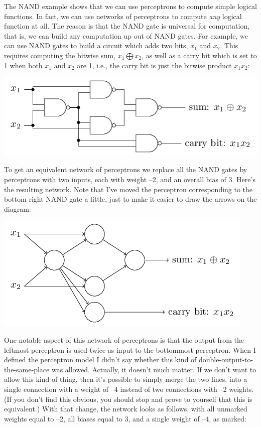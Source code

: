 \documentclass[a4paper,twoside,10pt]{book}
\begin{document}
The NAND example shows that we can use perceptrons to compute simple logical functions. In fact, we can use networks of perceptrons to compute \textit{any} logical function at all. The reason is that the NAND gate is universal for computation, that is, we can build any computation up out of NAND gates. For example, we can use NAND gates to build a circuit which adds two bits, $x_1$ and $x_2$. This requires computing the bitwise sum, $x_1\bigoplus x_2$, as well as a carry bit which is set to 1 when both $x_1$ and $x_2$ are 1, i.e., the carry bit is just the bitwise product $x_1x_2$:
\begin{center}
	\includegraphics[scale=0.5]{./figures/ch1/tikz3}
\end{center}	
To get an equivalent network of perceptrons we replace all the NAND gates by perceptrons with two inputs, each with weight --2, and an overall bias of 3. Here's the resulting network. Note that I've moved the perceptron corresponding to the bottom right NAND gate a little, just to make it easier to draw the arrows on the diagram:
\begin{center}
	\includegraphics[scale=0.5]{./figures/ch1/tikz4}
\end{center}	
One notable aspect of this network of perceptrons is that the output from the leftmost perceptron is used twice as input to the bottommost perceptron. When I defined the perceptron model I didn't say whether this kind of double-output-to-the-same-place was allowed. Actually, it doesn't much matter. If we don't want to allow this kind of thing, then it's possible to simply merge the two lines, into a single connection with a weight of --4 instead of two connections with --2 weights. (If you don't find this obvious, you should stop and prove to yourself that this is equivalent.) With that change, the network looks as follows, with all unmarked weights equal to --2, all biases equal to 3, and a single weight of --4, as marked:
\end{document}
